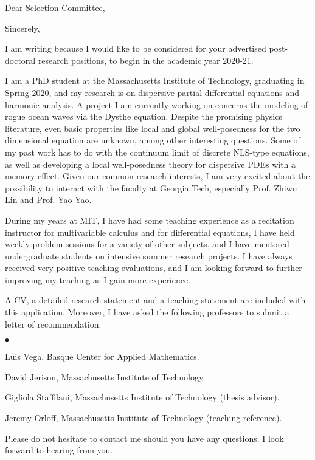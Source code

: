 %
%

\date{\today}
\opening{Dear Selection Committee,}
\closing{Sincerely,}
\makelettertitle

\justifying 

I am writing because I would like to be considered for your advertised post-doctoral research positions, to begin in the academic year 2020-21.

I am a PhD student at the Massachusetts Institute of Technology, graduating in Spring 2020, and my research is on dispersive partial differential equations and harmonic analysis. A project I am currently working on concerns the modeling of rogue ocean waves via the Dysthe equation. Despite the promising physics literature, even basic properties like local and global well-posedness for the two dimensional equation are unknown, among other interesting questions. Some of my past work has to do with the continuum limit of discrete NLS-type equations, as well as developing a local well-posedness theory for dispersive PDEs with a memory effect. Given our common research interests, I am very excited about the possibility to interact with the faculty at Georgia Tech, especially Prof. Zhiwu Lin and Prof. Yao Yao.

During my years at MIT, I have had some teaching experience as a recitation instructor for multivariable calculus and for differential equations, I have held weekly problem sessions for a variety of other subjects, and I have mentored undergraduate students on intensive summer research projects. I have always received very positive teaching evaluations, and I am looking forward to further improving my teaching as I gain more experience.

A CV, a detailed research statement and a teaching statement are included with this application. Moreover, I have asked the following professors to submit a letter of recommendation:
\begin{list}{$\bullet$}{}
\item Luis Vega, Basque Center for Applied Mathematics.
\item David Jerison, Massachusetts Institute of Technology.
\item Gigliola Staffilani, Massachusetts Institute of Technology (thesis advisor). 
\item Jeremy Orloff, Massachusetts Institute of Technology (teaching reference).
\end{list}

Please do not hesitate to contact me should you have any questions. I look forward to hearing from you.

\hspace{1.5cm}

\makeletterclosing

\clearpage


